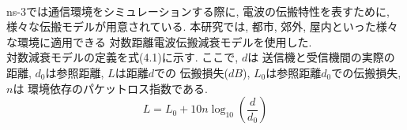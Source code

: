 \\[1em]
\indent ns-3では通信環境をシミュレーションする際に, 
電波の伝搬特性を表すために, 様々な伝搬モデルが用意されている. 
本研究では, 都市, 郊外, 屋内といった様々な環境に適用できる
対数距離電波伝搬減衰モデルを使用した.\\ 
\indent 対数減衰モデルの定義を式(4.1)に示す. ここで, $d$は
送信機と受信機間の実際の距離, $d_0$は参照距離, $L$は距離$d$での
伝搬損失($dB$), $L_0$は参照距離$d_0$での伝搬損失, $n$は
環境依存のパケットロス指数である. \\
\begin{equation}
  L = L_0 + 10n\log_{10}\left(\frac{d}{d_0}\right)
\end{equation}